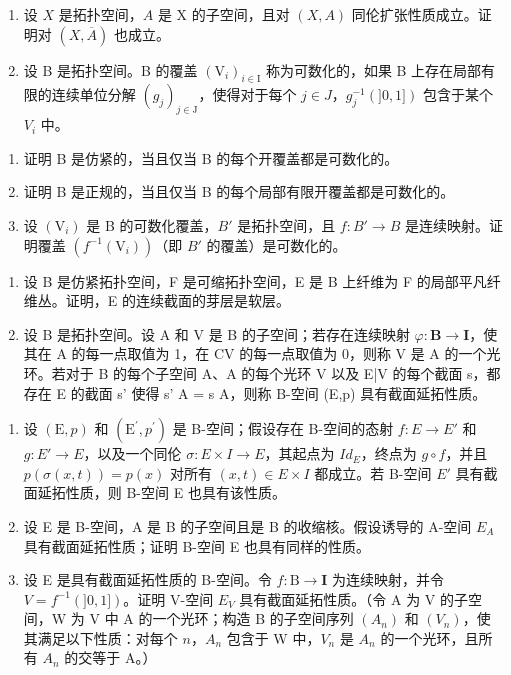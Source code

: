 \begin{enumerate}
\def\labelenumi{\arabic{enumi})}
\setcounter{enumi}{27}
\item
  设 \(X\) 是拓扑空间，\(A\) 是 X 的子空间，且对 \((X, A)\) 同伦扩张性质成立。证明对 \((X, \overline{A})\) 也成立。
\item
  设 B 是拓扑空间。B 的覆盖 \((\mathrm{V}_{i})_{i\in\mathrm{I}}\) 称为可数化的，如果 B 上存在局部有限的连续单位分解 \((g_{j})_{j\in\mathrm{J}}\)，使得对于每个 \(j\in J\)，\(g_{j}^{-1}(]0,1])\) 包含于某个 \(V_{i}\) 中。
\end{enumerate}

\begin{enumerate}
\def\labelenumi{\alph{enumi})}
\item
  证明 B 是仿紧的，当且仅当 B 的每个开覆盖都是可数化的。
\item
  证明 B 是正规的，当且仅当 B 的每个局部有限开覆盖都是可数化的。
\item
  设 \((\mathrm{V}_{i})\) 是 B 的可数化覆盖，\(B'\) 是拓扑空间，且 \(f: B' \to B\) 是连续映射。证明覆盖 \((f^{-1}(\mathrm{V}_{i}))\)（即 \(B'\) 的覆盖）是可数化的。
\end{enumerate}

\begin{enumerate}
\def\labelenumi{\arabic{enumi})}
\setcounter{enumi}{29}
\item
  设 B 是仿紧拓扑空间，F 是可缩拓扑空间，E 是 B 上纤维为 F 的局部平凡纤维丛。证明，E 的连续截面的芽层是软层。
\item
  设 B 是拓扑空间。设 A 和 V 是 B 的子空间；若存在连续映射 \(\varphi\colon\mathbf{B}\to\mathbf{I}\)，使其在 A 的每一点取值为 1，在 CV 的每一点取值为 0，则称 V 是 A 的一个光环。若对于 B 的每个子空间 A、A 的每个光环 V 以及 E|V 的每个截面 s，都存在 E 的截面 s' 使得 s' \textbar{} A = s \textbar{} A，则称 B-空间 (E,p) 具有截面延拓性质。
\end{enumerate}

\begin{enumerate}
\def\labelenumi{\alph{enumi})}
\item
  设 \((\mathrm{E},p)\) 和 \((\mathrm{E}^{\prime},p^{\prime})\) 是 B-空间；假设存在 B-空间的态射 \(f: E \to E'\) 和 \(g: E' \to E\)，以及一个同伦 \(\sigma: E \times I \to E\)，其起点为 \(Id_{E}\)，终点为 \(g \circ f\)，并且 \(p(\sigma(x,t)) = p(x)\) 对所有 \((x,t) \in E \times I\) 都成立。若 B-空间 \(E'\) 具有截面延拓性质，则 B-空间 E 也具有该性质。
\item
  设 E 是 B-空间，A 是 B 的子空间且是 B 的收缩核。假设诱导的 A-空间 \(E_{A}\) 具有截面延拓性质；证明 B-空间 E 也具有同样的性质。
\item
 设 E 是具有截面延拓性质的 B-空间。令 \(f \colon \mathrm{B} \to \mathbf{I}\) 为连续映射，并令 \(V = f^{-1}(]0,1])\)。证明 V-空间 \(E_V\) 具有截面延拓性质。（令 A 为 V 的子空间，W 为 V 中 A 的一个光环；构造 B 的子空间序列 \((A_n)\) 和 \((V_n)\)，使其满足以下性质：对每个 \(n\)，\(A_n\) 包含于 W 中，\(V_n\) 是 \(A_n\) 的一个光环，且所有 \(A_n\) 的交等于 A。）
\end{enumerate}

